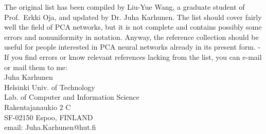 The original list has been compiled by Liu-Yue Wang, a graduate student of
Prof.\ Erkki Oja, and updated by Dr. Juha Karhunen.
The list should cover fairly well the field of PCA networks,
but it is not complete and contains possibly some errors
and nonuniformity in notation.
Anyway, the reference collection should be useful for people interested in
PCA neural networks already in its present form.
- If you find errors or know relevant references lacking from the list,
you can e-mail or mail them to me:\\[1cm]
%
Juha Karhunen\\Helsinki Univ. of Technology\\
Lab. of Computer and Information Science
\\Rakentajanaukio 2 C\\SF-02150 Espoo, FINLAND\\
email: Juha.Karhunen@hut.fi
%
%
\newpage
